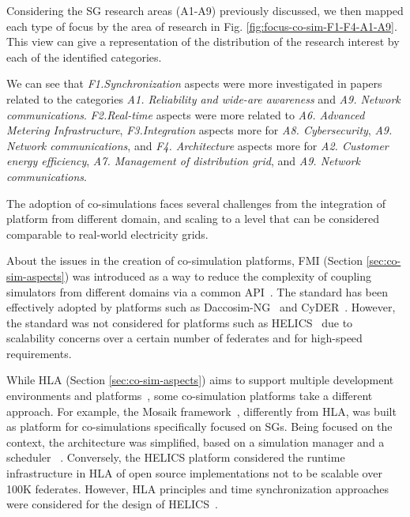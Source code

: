 \documentclass[1p]{elsarticle} %
\begin{document}

Considering the SG research areas (A1-A9) previously discussed, we then mapped each type of focus by the area of research in Fig. \ref{fig:focus-co-sim-F1-F4-A1-A9}. This view can give a representation of the distribution of the research interest by each of the identified categories.

We can see that \textit{F1.Synchronization} aspects were more investigated in papers related to the categories \textit{A1. Reliability and wide-are awareness} and \textit{A9. Network communications}. \textit{F2.Real-time} aspects were more related to \textit{A6. Advanced Metering Infrastructure}, \textit{F3.Integration} aspects more for \textit{A8. Cybersecurity}, \textit{A9. Network communications}, and \textit{F4. Architecture} aspects more for \textit{A2. Customer energy efficiency}, \textit{A7. Management of distribution grid}, and \textit{A9. Network communications}.

The adoption of co-simulations faces several challenges from the integration of platform from different domain, and scaling to a level that can be considered comparable to real-world electricity grids.

About the issues in the creation of co-simulation platforms, FMI (Section \ref{sec:co-sim-aspects}) was introduced as a way to reduce the complexity of coupling simulators from different domains via a common API~\citep{ref:blochwitz2011functional}. The standard has been effectively adopted by platforms such as Daccosim-NG~\citep{ref:evora2019daccosim} and CyDER~\citep{ref:nouidui2019cyder}. However, the standard was not considered for platforms such as HELICS~\citep{ref:palmintier2017design} due to scalability concerns over a certain number of federates and for high-speed requirements.

While HLA (Section \ref{sec:co-sim-aspects}) aims to support multiple development environments and platforms~\citep{HLAarch,IEEEHLA3}, some co-simulation platforms take a different approach. For example, the Mosaik framework~\cite{HLAarch2}, differently from HLA, was built as platform for co-simulations specifically focused on SGs. Being focused on the context, the architecture was simplified, based on a simulation manager and a scheduler ~\cite{104-Steinbrink2018-Smartgridco}. Conversely, the HELICS platform considered the runtime infrastructure in HLA of open source implementations not to be scalable over 100K federates. However, HLA principles and time synchronization approaches were considered for the design of HELICS~\citep{ref:palmintier2017design}.
\end{document}
